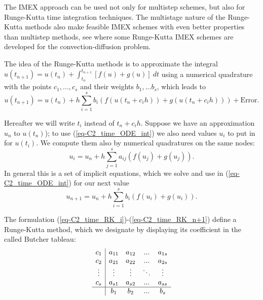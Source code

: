 The IMEX approach can be used not only for multistep schemes, but also for Runge-Kutta time integration techniques. The multistage nature of the Runge-Kutta methods also make feasible IMEX schemes with even better properties than multistep methods, see \cite{ascher_implicit-explicit_1997} where some Runge-Kutta IMEX schemes are developed for the convection-diffusion problem.

The idea of the Runge-Kutta methods is to approximate the integral $u(t_{n+1})=u(t_n)+\int_{t_n}^{t_{n+1}}\left[f(u)+g(u)\right]\ dt$ using a numerical quadrature with the points $c_1,...,c_s$ and their weights $b_1,...b_s$, which leads to
\begin{equation}
\label{eq-C2_time_ODE_int}
u(t_{n+1})=u(t_n)+h\sum_{i=1}^sb_i\left(f(u(t_n+c_ih))+g(u(t_n+c_ih))\right)+\mbox{Error}.
\end{equation}

Hereafter we will write $t_i$ instead of $t_n+c_ih$. Suppose we have an approximation $u_n$ to $u(t_n)$); to use (\ref{eq-C2_time_ODE_int}) we also need values $u_i$ to put in for $u(t_i)$. We compute them also by numerical quadratures on the same nodes:
\begin{equation}
\label{eq-C2_time_RK_i}
u_i=u_n+h\sum_{j=1}^sa_{ij}\left(f(u_j)+g(u_j)\right).
\end{equation}
In general this is a set of implicit equations, which we solve and use in (\ref{eq-C2_time_ODE_int}) for our next value
\begin{equation}
\label{eq-C2_time_RK_n+1}
u_{n+1}=u_n+h\sum_{i=1}^sb_i\left(f(u_i)+g(u_i)\right).
\end{equation}

The formulation (\ref{eq-C2_time_RK_i})-(\ref{eq-C2_time_RK_n+1}) define a Runge-Kutta method, which we designate by displaying its coefficient in the called Butcher tableau:
\begin{equation}
\label{eq-C2_time_Butcher_tab}
\begin{array}{c|cccc}
c_1&a_{11}&a_{12}&...&a_{1s}\\
c_2&a_{21}&a_{22}&...&a_{2s}\\
\vdots&\vdots&\vdots&\ddots&\vdots\\
c_s&a_{s1}&a_{s2}&...&a_{ss}\\
\hline
 &b_1&b_2&...&b_s
\end{array}
\end{equation}

